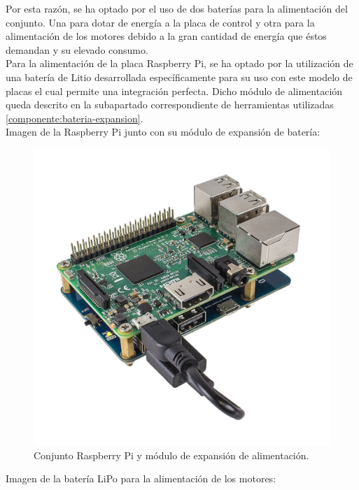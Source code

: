 Por esta razón, se ha optado por el uso de dos baterías para la alimentación del conjunto. Una para dotar de energía a la placa de control y otra para la alimentación de los 
motores debido a la gran cantidad de energía que éstos demandan y su elevado consumo.\\

Para la alimentación de la placa Raspberry Pi, se ha optado por la utilización de una batería de Litio desarrollada específicamente para su uso con este modelo de placas el cual permite una integración
perfecta. Dicho módulo de alimentación queda descrito en la subapartado correspondiente de herramientas utilizadas \ref{componente:bateria-expansion}.\\

Imagen de la Raspberry Pi junto con su módulo de expansión de batería:

\begin{figure}[H]
  \begin{center}
    \includegraphics[scale=0.10]{imagenes/modulo-expansion-rpi.jpg}
  \end{center}
  \caption{Conjunto Raspberry Pi y módulo de expansión de alimentación.}
  \label{figura:rpi-modulo-bateria}
\end{figure}

Imagen de la batería LiPo para la alimentación de los motores:

